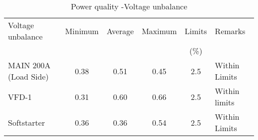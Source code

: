 \begin{table}[!htb]
	\caption{Power quality -Voltage unbalance}
	\label{tbl_ch04_elecaudit_powerquality_voltageunbalance}
	{\scriptsize
		
	\begin{tabular}{l|l|l|l|l|l}
		\hline
		Voltage unbalance & \multicolumn{1}{c|}{Minimum} & \multicolumn{1}{c|}{Average} & \multicolumn{1}{c|}{Maximum} & \multicolumn{1}{c|}{Limits} & Remarks \\ 
		& \multicolumn{1}{c|}{} & \multicolumn{1}{c|}{} & \multicolumn{1}{c|}{} & \multicolumn{1}{c|}{(\%)} &  \\ 
		\hline
		MAIN 200A (Load Side) & \multicolumn{1}{c|}{0.38} & \multicolumn{1}{c|}{ 0.51 } & \multicolumn{1}{c|}{0.45} & \multicolumn{1}{c|}{2.5} & Within  Limits \\ 
		\hline
		VFD-1 & \multicolumn{1}{c|}{0.31} & \multicolumn{1}{c|}{ 0.60 } & \multicolumn{1}{c|}{0.66} & \multicolumn{1}{c|}{2.5} & Within limits \\ 
		\hline
		Softstarter & \multicolumn{1}{c|}{0.36} & \multicolumn{1}{c|}{ 0.36 } & \multicolumn{1}{c|}{0.54} & \multicolumn{1}{c|}{2.5} & Within  Limits \\ 
		\hline
	\end{tabular}
		
	}%
\end{table}